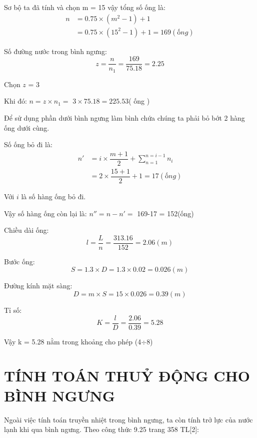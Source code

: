 Sơ bộ ta đã tính và chọn m = 15 vậy tổng số ống là:
\begin{equation*}
	\begin{split}
		n &= 0.75\times (m^2 - 1) + 1\\
		&=0.75 \times (15^2-1)+1 = 169(ống)
	\end{split}
\end{equation*}

Số đường nước trong bình ngưng:
\begin{equation*}
	z = \dfrac{n}{n_{1}} = \dfrac{169}{75.18} = 2.25 
\end{equation*}

Chọn $z$ = 3

Khi đó: $n = z\times n_{1} = $ $3 \times 75.18=225.53$( ống ) 



Để sử dụng phần dưới bình ngưng làm bình chứa chúng ta phải bỏ bớt 2 hàng ống dưới cùng.

Số ống bỏ đi là:
\begin{equation*}
	\begin{split}
		n' &= i\times \dfrac{m + 1}{2} + \sum_{n=1}^{n=i-1}n_{i}\\
		&=  2 \times \dfrac{15+1}{2}+1 = 17(ống)
	\end{split}
\end{equation*}

Với $i$ là số hàng ống bỏ đi.

Vậy số hàng ống còn lại là: $n'' = n - n' = $ 169-17 = 152(ống)

Chiều dài ống:
\begin{equation*}
	l = \dfrac{L}{n} = \dfrac{313.16}{152}= 2.06(m)
\end{equation*}

Bước ống:
\begin{equation*}
	S = 1.3\times D = 1.3 \times 0.02 = 0.026(m)
\end{equation*}

Đường kính mặt sàng:
\begin{equation*}
	D = m\times S = 15 \times 0.026 = 0.39(m)
\end{equation*}

Tỉ số:
\begin{equation*}
	K = \dfrac{l}{D} =\dfrac{2.06}{0.39}=5.28
\end{equation*}

Vậy k = 5.28 nằm trong khoảng cho phép (4$\div$8)

\section{TÍNH TOÁN THUỶ ĐỘNG CHO BÌNH NGƯNG}
Ngoài việc tính toán truyền nhiệt trong bình ngưng, ta còn tính trở lực của nước lạnh khi qua bình ngưng. Theo công thức 9.25 trang 358 TL[2]:

